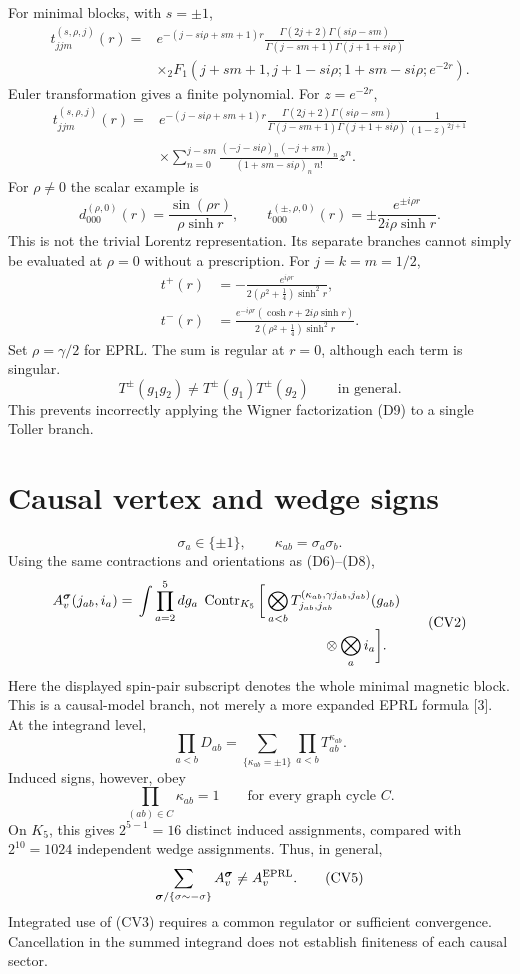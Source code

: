 \documentclass[11pt,a4paper]{article}
\newcommand{\Contr}{\operatorname{Contr}}
\newcommand{\eq}[2]{\begin{equation}#2\tag{#1}\end{equation}}
\begin{document}
For minimal blocks, with $s=\pm1$,
\eq{Q7}{\boxed{\begin{aligned}
t^{(s,\rho,j)}_{jjm}(r)={}&e^{-(j-si\rho+sm+1)r}\frac{\Gamma(2j+2)\Gamma(si\rho-sm)}{\Gamma(j-sm+1)\Gamma(j+1+si\rho)}\\
&\times{}_2F_1(j+sm+1,j+1-si\rho;1+sm-si\rho;e^{-2r}).
\end{aligned}}}
Euler transformation gives a finite polynomial. For $z=e^{-2r}$,
\eq{Q8}{\begin{aligned}
t^{(s,\rho,j)}_{jjm}(r)={}&e^{-(j-si\rho+sm+1)r}\frac{\Gamma(2j+2)\Gamma(si\rho-sm)}{\Gamma(j-sm+1)\Gamma(j+1+si\rho)}\frac1{(1-z)^{2j+1}}\\
&\times\sum_{n=0}^{j-sm}\frac{(-j-si\rho)_n(-j+sm)_n}{(1+sm-si\rho)_n\,n!}z^n.
\end{aligned}}
For $\rho\ne0$ the scalar example is
\eq{Q9}{d^{(\rho,0)}_{000}(r)=\frac{\sin(\rho r)}{\rho\sinh r},\qquad t^{(\pm,\rho,0)}_{000}(r)=\pm\frac{e^{\pm i\rho r}}{2i\rho\sinh r}.}
This is not the trivial Lorentz representation. Its separate branches cannot simply be evaluated at $\rho=0$ without a prescription.
For $j=k=m=1/2$,
\eq{Q10}{\begin{aligned}
t^+(r)&=-\frac{e^{i\rho r}}{2(\rho^2+\tfrac14)\sinh^2r},\\
t^-(r)&=\frac{e^{-i\rho r}(\cosh r+2i\rho\sinh r)}{2(\rho^2+\tfrac14)\sinh^2r}.
\end{aligned}}
Set $\rho=\gamma/2$ for EPRL. The sum is regular at $r=0$, although each term is singular.
\eq{Q11}{T^\pm(g_1g_2)\ne T^\pm(g_1)T^\pm(g_2)\qquad\text{in general}.}
This prevents incorrectly applying the Wigner factorization (D9) to a single Toller branch.

\section{Causal vertex and wedge signs}
\eq{CV1}{\sigma_a\in\{\pm1\},\qquad\kappa_{ab}=\sigma_a\sigma_b.}
Using the same contractions and orientations as (D6)--(D8),
\eq{CV2}{\begin{aligned}
A_v^{\boldsymbol\sigma}(j_{ab},i_a)={}&\int\prod_{a=2}^5dg_a\;\Contr_{K_5}\bigg[\bigotimes_{a<b}
T^{(\kappa_{ab},\gamma j_{ab},j_{ab})}_{j_{ab},j_{ab}}(g_{ab})\\
&\hspace{47mm}\otimes\bigotimes_ai_a\bigg].
\end{aligned}}
Here the displayed spin-pair subscript denotes the whole minimal magnetic block. This is a causal-model branch, not merely a more expanded EPRL formula [3].
At the integrand level,
\eq{CV3}{\prod_{a<b}D_{ab}=\sum_{\{\kappa_{ab}=\pm1\}}\prod_{a<b}T_{ab}^{\kappa_{ab}}.}
Induced signs, however, obey
\eq{CV4}{\prod_{(ab)\in C}\kappa_{ab}=1\qquad\text{for every graph cycle }C.}
On $K_5$, this gives $2^{5-1}=16$ distinct induced assignments, compared with $2^{10}=1024$ independent wedge assignments. Thus, in general,
\eq{CV5}{\sum_{\boldsymbol\sigma/\{\sigma\sim-\sigma\}}A_v^{\boldsymbol\sigma}\ne A_v^{\rm EPRL}.}
Integrated use of (CV3) requires a common regulator or sufficient convergence. Cancellation in the summed integrand does not establish finiteness of each causal sector.
\end{document}
